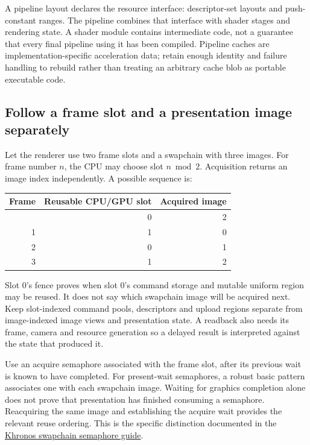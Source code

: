A pipeline layout declares the resource interface: descriptor-set layouts and push-constant ranges. The pipeline combines that interface with shader stages and rendering state. A shader module contains intermediate code, not a guarantee that every final pipeline using it has been compiled. Pipeline caches are implementation-specific acceleration data; retain enough identity and failure handling to rebuild rather than treating an arbitrary cache blob as portable executable code.

\subsection{Follow a frame slot and a presentation image separately}\label{01-foundations-i-ch011-follow-a-frame-slot-and-a-presentation-image-separately}

\hypertarget{01-foundations-i-ch011-follow-a-frame-slot-and-a-presentation-image-separately}{}

Let the renderer use two frame slots and a swapchain with three images. For frame number \(n\), the CPU may choose slot \(n\bmod2\). Acquisition returns an image index independently. A possible sequence is:

{\def\LTcaptype{none} %
\begin{longtable}[]{@{}rrr@{}}
\toprule\noalign{}
Frame & Reusable CPU/GPU slot & Acquired image \\
\midrule\noalign{}
\endhead
\bottomrule\noalign{}
\endlastfoot
0 & 0 & 2 \\
1 & 1 & 0 \\
2 & 0 & 1 \\
3 & 1 & 2 \\
\end{longtable}
}

Slot 0's fence proves when slot 0's command storage and mutable uniform region may be reused. It does not say which swapchain image will be acquired next. Keep slot-indexed command pools, descriptors and upload regions separate from image-indexed image views and presentation state. A readback also needs its frame, camera and resource generation so a delayed result is interpreted against the state that produced it.

Use an acquire semaphore associated with the frame slot, after its previous wait is known to have completed. For present-wait semaphores, a robust basic pattern associates one with each swapchain image. Waiting for graphics completion alone does not prove that presentation has finished consuming a semaphore. Reacquiring the same image and establishing the acquire wait provides the relevant reuse ordering. This is the specific distinction documented in the \href{https://docs.vulkan.org/guide/latest/swapchain_semaphore_reuse.html}{Khronos swapchain semaphore guide}.

